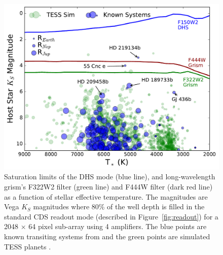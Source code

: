 \documentclass[iop]{emulateapj}
\begin{document}
\begin{figure}[!h]
\includegraphics[width=1.0\columnwidth]{brightness_scape.pdf}
\caption{Saturation limits of the DHS mode (blue line), and long-wavelength grism's F322W2 filter (green line) and F444W filter (dark red line) as a function of stellar effective temperature.
The magnitudes are Vega $K_S$ magnitudes where 80\% of the well depth is filled in the standard CDS readout mode (described in Figure~\ref{fig:readout}) for a 2048 $\times$ 64 pixel sub-array using 4 amplifiers.
The blue points are known transiting systems from and the green points are simulated TESS planets \citep{sullivan2015tess}.}\label{fig:saturationLim}
\end{figure}

\end{document}
